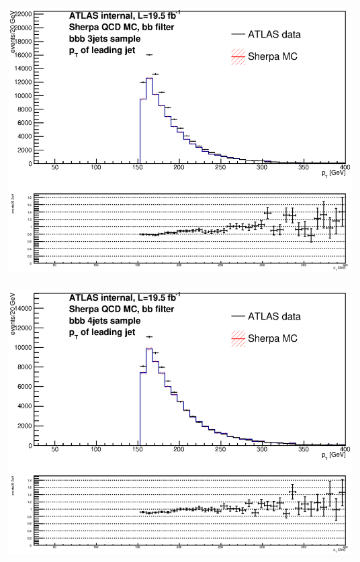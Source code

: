 \begin{figure}[phtb!]
  \begin{center}
  \begin{subfigure}[$bbb$ 3 jet category]{0.3\textwidth}\includegraphics[width=\textwidth]{MonteCarlo/figures/pt0_bbb_3jets.eps}\end{subfigure}
  \begin{subfigure}[$bbb$ 4 jet category]{0.3\textwidth}\includegraphics[width=\textwidth]{MonteCarlo/figures/pt0_bbb_4jets.eps}\end{subfigure}

\end{center}
\end{figure}

